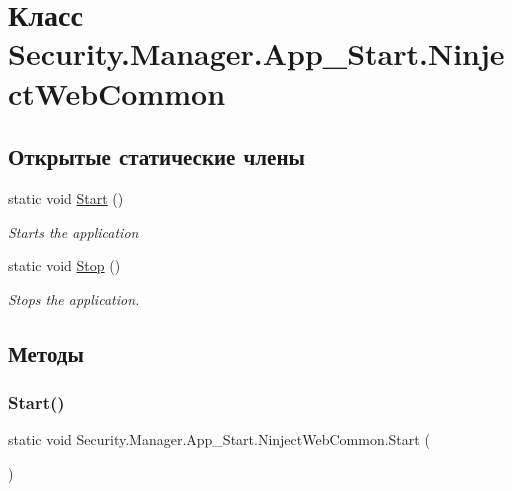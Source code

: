 \hypertarget{class_security_1_1_manager_1_1_app___start_1_1_ninject_web_common}{}\section{Класс Security.\+Manager.\+App\+\_\+\+Start.\+Ninject\+Web\+Common}
\label{class_security_1_1_manager_1_1_app___start_1_1_ninject_web_common}
\subsection*{Открытые статические члены}
\begin{DoxyCompactItemize}
\item 
static void \hyperlink{class_security_1_1_manager_1_1_app___start_1_1_ninject_web_common_a82fc5c905ba1946a6bca3576bb6c9af1}{Start} ()
\begin{DoxyCompactList}\small\item\em Starts the application \end{DoxyCompactList}\item 
static void \hyperlink{class_security_1_1_manager_1_1_app___start_1_1_ninject_web_common_ae7b72f5a95064ff4c9de7677b6d9c37f}{Stop} ()
\begin{DoxyCompactList}\small\item\em Stops the application. \end{DoxyCompactList}\end{DoxyCompactItemize}


\subsection{Методы}
\mbox{\label{class_security_1_1_manager_1_1_app___start_1_1_ninject_web_common_a82fc5c905ba1946a6bca3576bb6c9af1}} 
\subsubsection{\texorpdfstring{Start()}{Start()}}
{\footnotesize\ttfamily static void Security.\+Manager.\+App\+\_\+\+Start.\+Ninject\+Web\+Common.\+Start (\begin{DoxyParamCaption}{ }\end{DoxyParamCaption})\hspace{0.3cm}{\ttfamily [static]}}



